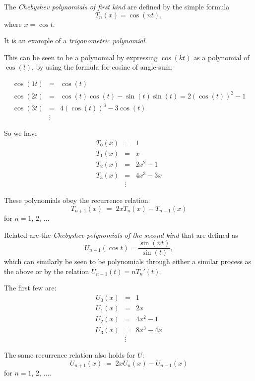 \documentclass{article}
\begin{document}
The \emph{Chebyshev polynomials of first kind} are defined by the simple 
formula $$T_n(x)=\cos(nt),$$ where $x=\cos t$.

It is an example of a \emph{trigonometric polynomial}.

This can be seen to be a polynomial by expressing $\cos(kt)$ as a polynomial of $\cos(t)$, by using the formula for cosine of angle-sum:

\begin{eqnarray*}
\cos(1t)&=&\cos(t)\\
\cos(2t)&=&\cos(t)\cos(t) - \sin(t)\sin(t) = 2(\cos(t))^2-1\\
\cos(3t)&=&4(\cos(t))^3-3\cos(t)\\
&\vdots&
\end{eqnarray*}

So we have
\begin{eqnarray*}
T_0(x)&=&1\\
T_1(x)&=&x\\
T_2(x)&=&2x^2-1\\
T_3(x)&=&4x^3-3x\\
&\vdots&
\end{eqnarray*}

These polynomials obey the recurrence relation:
$$T_{n+1}(x) \;=\; 2xT_n(x)-T_{n-1}(x)$$
for $n = 1,\,2,\,\ldots$

Related are the \emph{Chebyshev polynomials of the second kind} that are
defined as $$U_{n-1}(\cos t) = \frac{\sin(n t)}{\sin (t)},$$ which
can similarly be seen to be polynomials through either a similar process as the
above or by the relation $U_{n-1}(t) = n T_n'(t)$.

The first few are:
\begin{eqnarray*}
U_0(x)&=&1\\
U_1(x)&=&2x\\
U_2(x)&=&4x^2-1\\
U_3(x)&=&8x^3-4x\\
&\vdots&
\end{eqnarray*}

The same recurrence relation also holds for $U$:
$$U_{n+1}(x) \;=\; 2xU_n(x)-U_{n-1}(x)$$
for $n = 1,\,2,\,\ldots$.
\end{document}
